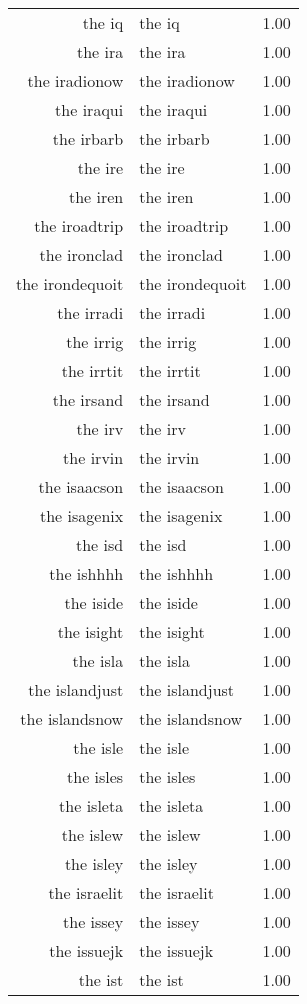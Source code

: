 \begin{table}[ht]
\begin{tabular}{rlr}
  the iq & the iq & 1.00 \\ 
  the ira & the ira & 1.00 \\ 
  the iradionow & the iradionow & 1.00 \\ 
  the iraqui & the iraqui & 1.00 \\ 
  the irbarb & the irbarb & 1.00 \\ 
  the ire & the ire & 1.00 \\ 
  the iren & the iren & 1.00 \\ 
  the iroadtrip & the iroadtrip & 1.00 \\ 
  the ironclad & the ironclad & 1.00 \\ 
  the irondequoit & the irondequoit & 1.00 \\ 
  the irradi & the irradi & 1.00 \\ 
  the irrig & the irrig & 1.00 \\ 
  the irrtit & the irrtit & 1.00 \\ 
  the irsand & the irsand & 1.00 \\ 
  the irv & the irv & 1.00 \\ 
  the irvin & the irvin & 1.00 \\ 
  the isaacson & the isaacson & 1.00 \\ 
  the isagenix & the isagenix & 1.00 \\ 
  the isd & the isd & 1.00 \\ 
  the ishhhh & the ishhhh & 1.00 \\ 
  the iside & the iside & 1.00 \\ 
  the isight & the isight & 1.00 \\ 
  the isla & the isla & 1.00 \\ 
  the islandjust & the islandjust & 1.00 \\ 
  the islandsnow & the islandsnow & 1.00 \\ 
  the isle & the isle & 1.00 \\ 
  the isles & the isles & 1.00 \\ 
  the isleta & the isleta & 1.00 \\ 
  the islew & the islew & 1.00 \\ 
  the isley & the isley & 1.00 \\ 
  the israelit & the israelit & 1.00 \\ 
  the issey & the issey & 1.00 \\ 
  the issuejk & the issuejk & 1.00 \\ 
  the ist & the ist & 1.00 \\ 

\end{tabular}
\end{table}
